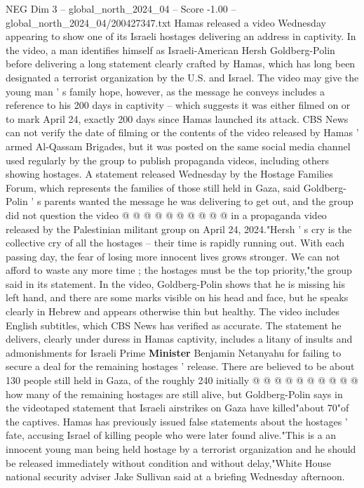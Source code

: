 \begin{textsample}{NEG Dim 3 – global\_north\_2024\_04 – Score -1.00 – global\_north\_2024\_04/200427347.txt}  \label{ex:f3_neg_379}
Hamas released a video Wednesday appearing to show one of its Israeli hostages delivering an address in captivity.
In the video, a man identifies himself as Israeli-American Hersh Goldberg-Polin before delivering a long statement clearly crafted by Hamas, which has long been designated a terrorist organization by the U.S. and Israel.
The video may give the young man ' s family hope, however, as the message he conveys includes a reference to his 200 days in captivity -- which suggests it was either filmed on or to mark April 24, exactly 200 days since Hamas launched its attack.
CBS News can not verify the date of filming or the contents of the video released by Hamas ' armed Al-Qassam Brigades, but it was posted on the same social media channel used regularly by the group to publish propaganda videos, including others showing hostages.
A statement released Wednesday by the Hostage Families Forum, which represents the families of those still held in Gaza, said Goldberg-Polin ' s parents wanted the message he was delivering to get out, and the group did not question the video @ @ @ @ @ @ @ @ @ @ in a propaganda video released by the Palestinian militant group on April 24, 2024."Hersh ' s cry is the collective cry of all the hostages -- their time is rapidly running out.
With each passing day, the fear of losing more innocent lives grows stronger.
We can not afford to waste any more time ; the hostages must be the top priority,"the group said in its statement.
In the video, Goldberg-Polin shows that he is missing his left hand, and there are some marks visible on his head and face, but he speaks clearly in Hebrew and appears otherwise thin but healthy.
The video includes English subtitles, which CBS News has verified as accurate.
The statement he delivers, clearly under duress in Hamas captivity, includes a litany of insults and admonishments for Israeli Prime \textbf{Minister} Benjamin Netanyahu for failing to secure a deal for the remaining hostages ' release.
There are believed to be about 130 people still held in Gaza, of the roughly 240 initially @ @ @ @ @ @ @ @ @ @ how many of the remaining hostages are still alive, but Goldberg-Polin says in the videotaped statement that Israeli airstrikes on Gaza have killed"about 70"of the captives.
Hamas has previously issued false statements about the hostages ' fate, accusing Israel of killing people who were later found alive."This is a an innocent young man being held hostage by a terrorist organization and he should be released immediately without condition and without delay,"White House national security adviser Jake Sullivan said at a briefing Wednesday afternoon.

\end{textsample}
